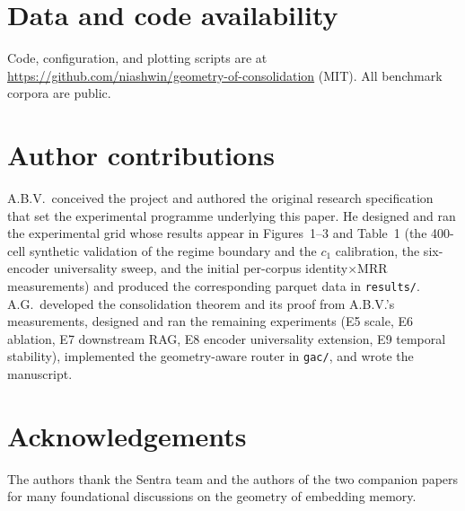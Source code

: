 \documentclass[11pt]{article}
\theoremstyle{definition}
\theoremstyle{remark}
\begin{document}
\section*{Data and code availability}
Code, configuration, and plotting scripts are at
\url{https://github.com/niashwin/geometry-of-consolidation} (MIT). All
benchmark corpora are public.

\section*{Author contributions}
A.B.V.\ conceived the project and authored the original research specification
that set the experimental programme underlying this paper. He designed and
ran the experimental grid whose results appear in Figures~1--3 and
Table~1 (the 400-cell synthetic validation of the regime boundary and the
$c_1$ calibration, the six-encoder universality sweep, and the initial
per-corpus identity$\times$MRR measurements) and produced the corresponding
parquet data in \texttt{results/}. A.G.\ developed the consolidation theorem
and its proof from A.B.V.'s measurements, designed and ran the remaining
experiments (E5 scale, E6 ablation, E7 downstream RAG, E8 encoder
universality extension, E9 temporal stability), implemented the
geometry-aware router in \texttt{gac/}, and wrote the manuscript.

\section*{Acknowledgements}
The authors thank the Sentra team and the authors of the two companion
papers for many foundational discussions on the geometry of embedding memory.



\end{document}
